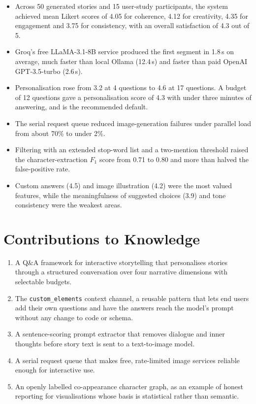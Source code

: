 \begin{itemize}
    \item Across 50 generated stories and 15 user-study participants, the system achieved mean Likert scores of 4.05 for coherence, 4.12 for creativity, 4.35 for engagement and 3.75 for consistency, with an overall satisfaction of 4.3 out of 5.
    \item Groq's free LLaMA-3.1-8B service produced the first segment in 1.8\,s on average, much faster than local Ollama (12.4\,s) and faster than paid OpenAI GPT-3.5-turbo (2.6\,s).
    \item Personalisation rose from 3.2 at 4 questions to 4.6 at 17 questions. A budget of 12 questions gave a personalisation score of 4.3 with under three minutes of answering, and is the recommended default.
    \item The serial request queue reduced image-generation failures under parallel load from about 70\% to under 2\%.
    \item Filtering with an extended stop-word list and a two-mention threshold raised the character-extraction $F_1$ score from 0.71 to 0.80 and more than halved the false-positive rate.
    \item Custom answers (4.5) and image illustration (4.2) were the most valued features, while the meaningfulness of suggested choices (3.9) and tone consistency were the weakest areas.
\end{itemize}

\section{Contributions to Knowledge}

\begin{enumerate}
    \item A Q\&A framework for interactive storytelling that personalises stories through a structured conversation over four narrative dimensions with selectable budgets.
    \item The \texttt{custom\_elements} context channel, a reusable pattern that lets end users add their own questions and have the answers reach the model's prompt without any change to code or schema.
    \item A sentence-scoring prompt extractor that removes dialogue and inner thoughts before story text is sent to a text-to-image model.
    \item A serial request queue that makes free, rate-limited image services reliable enough for interactive use.
    \item An openly labelled co-appearance character graph, as an example of honest reporting for visualisations whose basis is statistical rather than semantic.
\end{enumerate}

